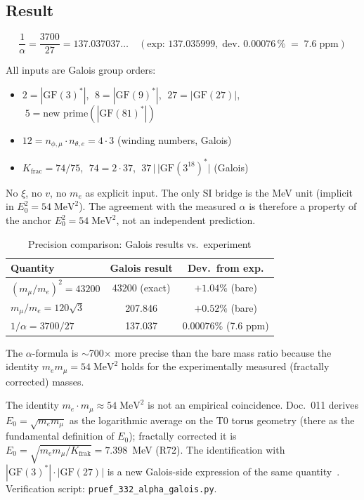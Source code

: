 \subsection{Result}

\begin{equation}
\boxed{
  \frac{1}{\alpha} = \frac{3700}{27} = 137.037037\ldots
  \quad (\text{exp: }137.035999,\;\text{dev. }0.00076\,\%\;=\;7.6\;\text{ppm})
}
\end{equation}

All inputs are Galois group orders:
\begin{itemize}
  \item $2 = |\text{GF}(3)^*|$, $\;8 = |\text{GF}(9)^*|$,
        $\;27 = |\text{GF}(27)|$, $\;5 = \text{new prime}(|\text{GF}(81)^*|)$
  \item $12 = n_{\phi,\mu} \cdot n_{\theta,e} = 4 \cdot 3$ (winding numbers, Galois)
  \item $K_\text{frac} = 74/75$, $\;74 = 2 \cdot 37$,
        $\;37\,|\,|\text{GF}(3^{18})^*|$ (Galois)
\end{itemize}
No $\xi$, no $v$, no $m_e$ as explicit input.
The only SI bridge is the MeV unit (implicit in $E_0^2 = 54\;\text{MeV}^2$).
The agreement with the measured $\alpha$ is therefore a property of the
anchor $E_0^2 = 54\;\text{MeV}^2$, not an independent prediction.

\begin{table}[H]
\centering
\caption{Precision comparison: Galois results vs.\ experiment}
\begin{tabular}{lcc}
\toprule
Quantity & Galois result & Dev.\ from exp. \\
\midrule
$(m_\mu/m_e)^2 = 43200$ & 43200 (exact) & $+1.04\%$ (bare) \\
$m_\mu/m_e = 120\sqrt{3}$ & 207.846 & $+0.52\%$ (bare) \\
$1/\alpha = 3700/27$ & 137.037 & $0.00076\%$ (7.6 ppm) \\
\bottomrule
\end{tabular}
\end{table}

The $\alpha$-formula is $\sim$700$\times$ more precise than the bare mass ratio
because the identity $m_e m_\mu = 54\;\text{MeV}^2$ holds for the
experimentally measured (fractally corrected) masses.

The identity $m_e \cdot m_\mu \approx 54\;\text{MeV}^2$ is not an empirical
coincidence. Doc.~011 derives $E_0 = \sqrt{m_e m_\mu}$ as the logarithmic
average on the T0 torus geometry (there as the fundamental definition of $E_0$);
fractally corrected it is $E_0 = \sqrt{m_e m_\mu/K_{\text{frak}}} = 7.398$~MeV (R72).
The identification with $|\text{GF}(3)^*|\cdot|\text{GF}(27)|$ is a
new Galois-side expression of the same quantity~\KM.
Verification script: \texttt{pruef\_332\_alpha\_galois.py}.

